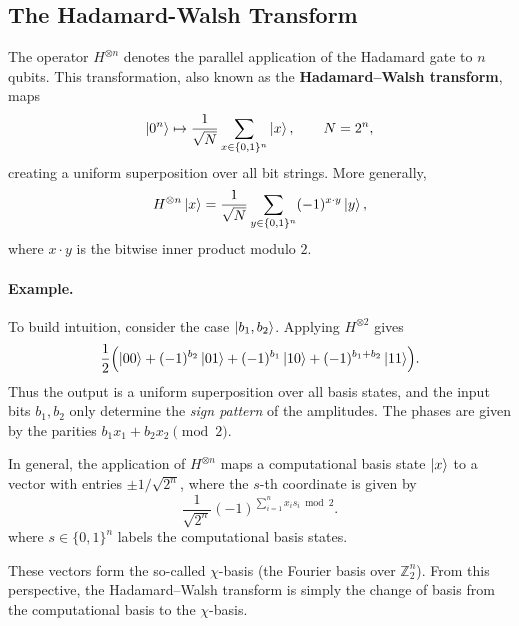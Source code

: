 \subsection{The Hadamard-Walsh Transform}

The operator $H^{\otimes n}$ denotes the parallel application of the Hadamard
gate to $n$ qubits. This transformation, also known as the
\textbf{Hadamard--Walsh transform}, maps
\[
\ket{0^n} \mapsto
\frac{1}{\sqrt{N}} \sum_{x \in \{0,1\}^n} \ket{x},
\qquad N = 2^n,
\]
creating a uniform superposition over all bit strings.
More generally,
\[
H^{\otimes n}\ket{x}
=
\frac{1}{\sqrt{N}}
\sum_{y \in \{0,1\}^n}
(-1)^{x \cdot y}\ket{y},
\]
where $x \cdot y$ is the bitwise inner product modulo $2$.

\paragraph{Example.}
To build intuition, consider the case $\ket{b_1,b_2}$.
Applying $H^{\otimes 2}$ gives
\[
\frac{1}{2}\Bigl(
\ket{00}
+ (-1)^{b_2}\ket{01}
+ (-1)^{b_1}\ket{10}
+ (-1)^{b_1+b_2}\ket{11}
\Bigr).
\]
Thus the output is a uniform superposition over all basis states, and the
input bits $b_1,b_2$ only determine the \emph{sign pattern} of the
amplitudes. The phases are given by the parities
$b_1x_1 + b_2x_2 \pmod{2}$.

In general, the application of $H^{\otimes n}$ maps a computational basis
state $\ket{x}$ to a vector with entries $\pm 1/\sqrt{2^n}$, where the
$s$-th coordinate is given by
\[
\frac{1}{\sqrt{2^n}}(-1)^{\sum_{i=1}^n x_i s_i \bmod 2}.
\]
where $s \in \{0,1\}^n$ labels the computational basis states.


These vectors form the so-called $\chi$-basis (the Fourier basis over
$\mathbb{Z}_2^n$). From this perspective, the Hadamard--Walsh transform is
simply the change of basis from the computational basis to the $\chi$-basis.
